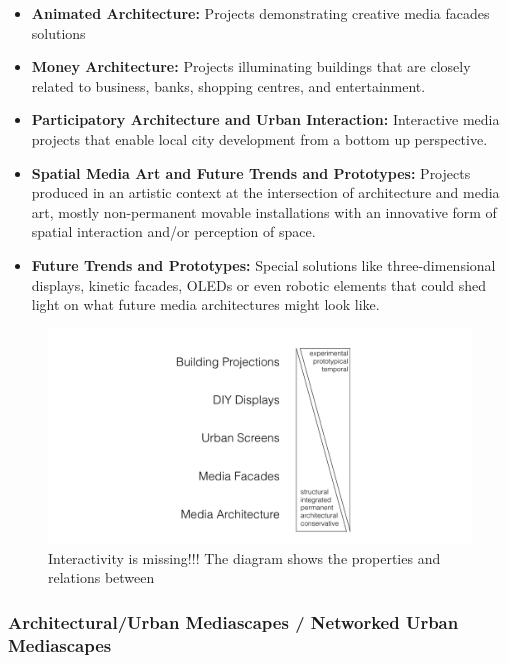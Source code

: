 \begin{itemize}
\item \textbf{Animated Architecture:} Projects demonstrating creative media facades solutions
\item \textbf{Money Architecture:} Projects illuminating buildings that are closely related to business, banks, shopping centres, and entertainment.
\item \textbf{Participatory Architecture and Urban Interaction:} Interactive media projects that enable local city development from a bottom up perspective.
\item \textbf{Spatial Media Art and Future Trends and Prototypes:} Projects produced in an artistic context at the intersection of architecture and media art, mostly non-permanent movable installations with an innovative form of spatial interaction and/or perception of space.
\item \textbf{Future Trends and Prototypes:} Special solutions like three-dimensional displays, kinetic facades, OLEDs or even robotic elements that could shed light on what future media architectures might look like.
\end{itemize}



\begin{figure}[htp]
\centering
\includegraphics[width=\textwidth]{Illustrations/Typo_diagram.png}
\caption{Interactivity is missing!!! The diagram shows the properties and relations between }
\label{Typo_diagram}
\end{figure}


\subsubsection{Architectural/Urban Mediascapes  / Networked Urban Mediascapes}

